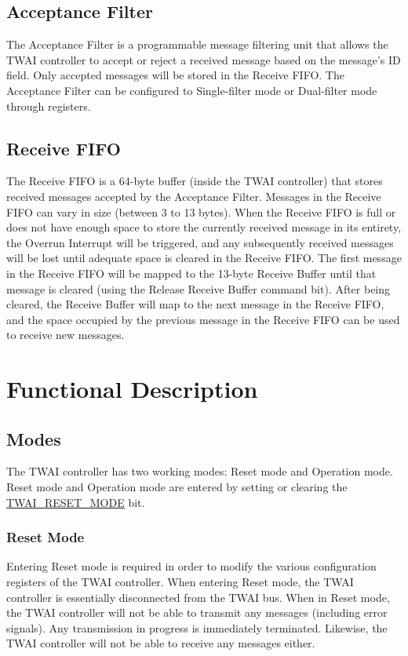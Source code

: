 \documentclass[main\_\_EN.tex]{subfiles}
\begin{document}
\subsection{Acceptance Filter}
The Acceptance Filter is a programmable message filtering unit that allows the TWAI controller to accept or reject a received message based on the message's ID field. Only accepted messages will be stored in the Receive FIFO. The Acceptance Filter can be configured to Single-filter mode or Dual-filter mode through registers.

\subsection{Receive FIFO}
The Receive FIFO is a 64-byte buffer (inside the TWAI controller) that stores received messages accepted by the Acceptance Filter. Messages in the Receive FIFO can vary in size (between 3 to 13 bytes). When the Receive FIFO is full or does not have enough space to store the currently received message in its entirety, the Overrun Interrupt will be triggered, and any subsequently received messages will be lost until adequate space is cleared in the Receive FIFO. The first message in the Receive FIFO will be mapped to the 13-byte Receive Buffer until that message is cleared (using the Release Receive Buffer command bit). After being cleared, the Receive Buffer will map to the next message in the Receive FIFO, and the space occupied by the previous message in the Receive FIFO can be used to receive new messages.

\section{Functional Description}

\subsection{Modes}
\label{sec:twai-modes}
The \chipname{} TWAI controller has two working modes: Reset mode and Operation mode. Reset mode and Operation mode are entered by setting or clearing the \hyperref[fielddesc:TWAIRESETMODE]{TWAI\_RESET\_MODE} bit.

\subsubsection{Reset Mode}
Entering Reset mode is required in order to modify the various configuration registers of the TWAI controller. When entering Reset mode, the TWAI controller is essentially disconnected from the TWAI bus. When in Reset mode, the TWAI controller will not be able to transmit any messages (including error signals). Any transmission in progress is immediately terminated. Likewise, the TWAI controller will not be able to receive any messages either.
\end{document}

